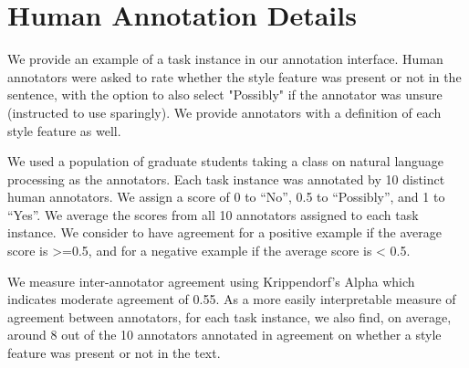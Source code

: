 \newpage
\section{Human Annotation Details}
\label{sec:appendix:humanannotation}

We provide an example of a task instance in our annotation interface. Human annotators were asked to rate whether the style feature was present or not in the sentence, with the option to also select "Possibly" if the annotator was unsure (instructed to use sparingly). We provide annotators with a definition of each style feature as well.

\mturkinterfacefig

\noindent We used a population of graduate students taking a class on natural language processing as the annotators. Each task instance was annotated by 10 distinct human annotators. We assign a score of 0 to ``No'', 0.5 to ``Possibly'', and 1 to ``Yes''. We average the scores from all  10 annotators assigned to each task instance. We consider to have  agreement for a positive example if the average score is >=0.5, and   for a negative example if the average score is < 0.5.

We measure inter-annotator agreement using Krippendorf's Alpha \citep{krippendorffalpha} which indicates moderate agreement of 0.55.  As a more easily interpretable measure of agreement between annotators, for each task instance, we also find, on average, around 8 out of the 10 annotators annotated in agreement on whether a style feature was present or not in the text.